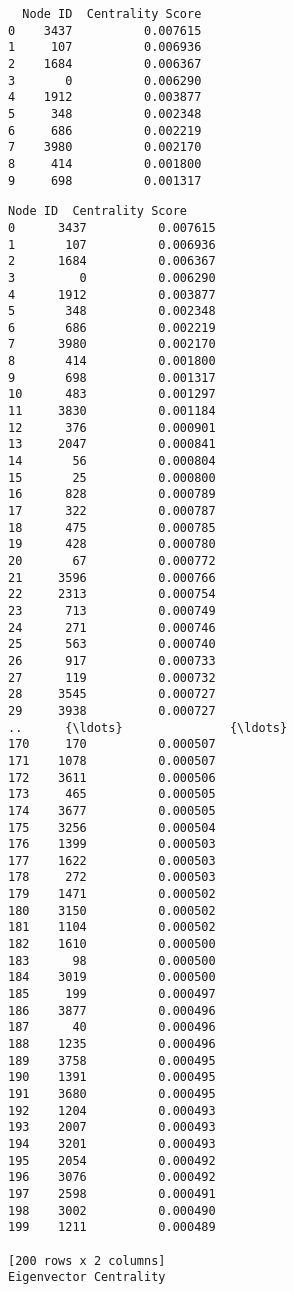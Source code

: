 \documentclass[11pt]{article}
\begin{document}
    
    \begin{verbatim}
  Node ID  Centrality Score
0    3437          0.007615
1     107          0.006936
2    1684          0.006367
3       0          0.006290
4    1912          0.003877
5     348          0.002348
6     686          0.002219
7    3980          0.002170
8     414          0.001800
9     698          0.001317
    \end{verbatim}

    
    \begin{Verbatim}[commandchars=\\\{\}]
    Node ID  Centrality Score
0      3437          0.007615
1       107          0.006936
2      1684          0.006367
3         0          0.006290
4      1912          0.003877
5       348          0.002348
6       686          0.002219
7      3980          0.002170
8       414          0.001800
9       698          0.001317
10      483          0.001297
11     3830          0.001184
12      376          0.000901
13     2047          0.000841
14       56          0.000804
15       25          0.000800
16      828          0.000789
17      322          0.000787
18      475          0.000785
19      428          0.000780
20       67          0.000772
21     3596          0.000766
22     2313          0.000754
23      713          0.000749
24      271          0.000746
25      563          0.000740
26      917          0.000733
27      119          0.000732
28     3545          0.000727
29     3938          0.000727
..      {\ldots}               {\ldots}
170     170          0.000507
171    1078          0.000507
172    3611          0.000506
173     465          0.000505
174    3677          0.000505
175    3256          0.000504
176    1399          0.000503
177    1622          0.000503
178     272          0.000503
179    1471          0.000502
180    3150          0.000502
181    1104          0.000502
182    1610          0.000500
183      98          0.000500
184    3019          0.000500
185     199          0.000497
186    3877          0.000496
187      40          0.000496
188    1235          0.000496
189    3758          0.000495
190    1391          0.000495
191    3680          0.000495
192    1204          0.000493
193    2007          0.000493
194    3201          0.000493
195    2054          0.000492
196    3076          0.000492
197    2598          0.000491
198    3002          0.000490
199    1211          0.000489

[200 rows x 2 columns]
Eigenvector Centrality

    \end{Verbatim}
\end{document}
